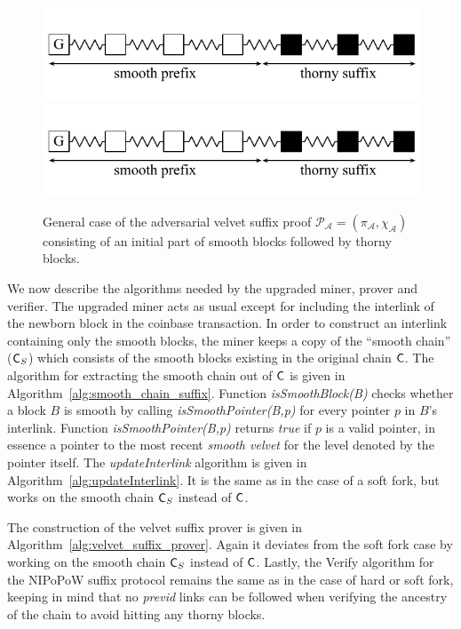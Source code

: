 \begin{figure}[h!]
	\begin{center}
		\iftwocolumn
			\includegraphics[width=0.9\columnwidth]{figures/adversarial_velvet_proof.pdf}
		\else
			\includegraphics[width=0.5\columnwidth]{figures/adversarial_velvet_proof.pdf}
		\fi
	\end{center}
	\caption{General case of the adversarial velvet suffix proof $\mathcal{P_A} = (\pi_\mathcal{A}, \chi_\mathcal{A})$ consisting of an initial part of smooth blocks followed by thorny blocks.}
	\label{fig:adversarial_velvet_proof}
\end{figure}
We now describe the algorithms needed by the upgraded miner, prover and verifier. The upgraded miner acts as usual except for including the interlink of the newborn block in the coinbase transaction. In order to construct an interlink containing only the smooth blocks, the miner keeps a copy of the ``smooth chain'' ($\mathsf{C}_S$) which consists of the smooth blocks existing in the original chain $\mathsf{C}$. The algorithm for extracting the smooth chain out of $\mathsf{C}$ is given in Algorithm~\ref{alg:smooth_chain_suffix}. Function \textit{isSmoothBlock(B)} checks whether a block $B$ is smooth by calling \textit{isSmoothPointer(B,p)} for every pointer $p$ in $B$'s interlink. Function \textit{isSmoothPointer(B,p)} returns \emph{true} if $p$ is a valid pointer, in essence a pointer to the most recent \emph{smooth velvet} for the level denoted by the pointer itself. The \textit{updateInterlink} algorithm is given in Algorithm~\ref{alg:updateInterlink}. It is the same as in the case of a soft fork, but works on the smooth chain $\mathsf{C}_S$ instead of $\mathsf{C}$.

The construction of the velvet suffix prover is given in Algorithm~\ref{alg:velvet_suffix_prover}. Again it deviates from the soft fork case by working on the smooth chain $\mathsf{C}_S$ instead of $\mathsf{C}$.
Lastly, the Verify algorithm for the NIPoPoW suffix protocol remains the same as in the case of hard or soft fork, keeping in mind that no \emph{previd} links can be followed when verifying the ancestry of the chain to avoid hitting any thorny blocks.

